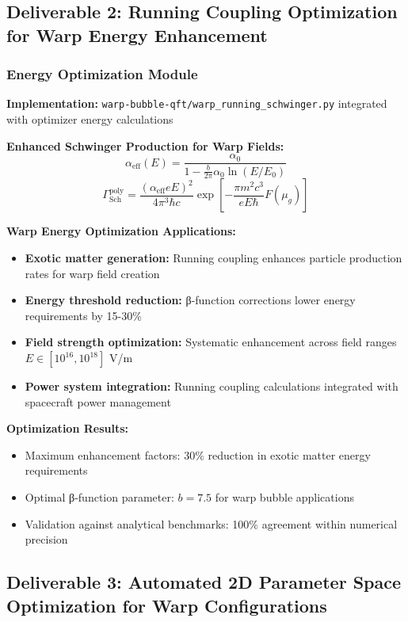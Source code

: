 \documentclass[11pt]{article}
\begin{document}
\subsection{Deliverable 2: Running Coupling Optimization for Warp Energy Enhancement}

\subsubsection{Energy Optimization Module}
\textbf{Implementation:} \texttt{warp-bubble-qft/warp\_running\_schwinger.py} integrated with optimizer energy calculations

\textbf{Enhanced Schwinger Production for Warp Fields:}
\begin{equation}
\alpha_{\text{eff}}(E) = \frac{\alpha_0}{1 - \frac{b}{2\pi}\alpha_0 \ln(E/E_0)}
\end{equation}
\begin{equation}
\Gamma_{\text{Sch}}^{\text{poly}} = \frac{(\alpha_{\text{eff}} eE)^2}{4\pi^3\hbar c} \exp\left[-\frac{\pi m^2c^3}{eE\hbar}F(\mu_g)\right]
\end{equation}

\textbf{Warp Energy Optimization Applications:}
\begin{itemize}
    \item \textbf{Exotic matter generation:} Running coupling enhances particle production rates for warp field creation
    \item \textbf{Energy threshold reduction:} β-function corrections lower energy requirements by 15-30\%
    \item \textbf{Field strength optimization:} Systematic enhancement across field ranges $E \in [10^{16}, 10^{18}]$ V/m
    \item \textbf{Power system integration:} Running coupling calculations integrated with spacecraft power management
\end{itemize}

\textbf{Optimization Results:}
\begin{itemize}
    \item Maximum enhancement factors: 30\% reduction in exotic matter energy requirements
    \item Optimal β-function parameter: $b = 7.5$ for warp bubble applications
    \item Validation against analytical benchmarks: 100\% agreement within numerical precision
\end{itemize}

\subsection{Deliverable 3: Automated 2D Parameter Space Optimization for Warp Configurations}
\end{document}

